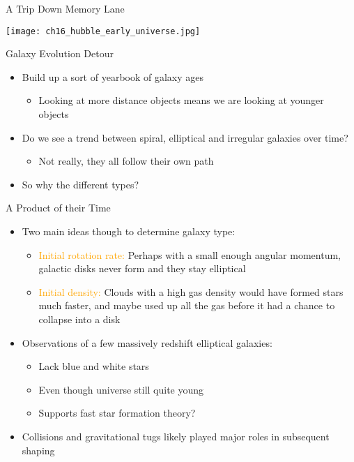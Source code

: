 \documentclass[pdf,aspectratio=169]{beamer}
\begin{document}
\begin{frame}{A Trip Down Memory Lane}
  \begin{center}
	\texttt{[image: ch16\_hubble\_early\_universe.jpg]}
  \end{center}
\end{frame}

\begin{frame}{Galaxy Evolution Detour}
  \begin{itemize}
	\item Build up a sort of yearbook of galaxy ages
	  \begin{itemize}
		\item Looking at more distance objects means we are looking at younger objects
	  \end{itemize}
	\item Do we see a trend between spiral, elliptical and irregular galaxies over time?
	  \begin{itemize}
		\item Not really, they all follow their own path
	  \end{itemize}
	\item So why the different types?
  \end{itemize}
\end{frame}

\begin{frame}{A Product of their Time}
  \begin{itemize}
	\item Two main ideas though to determine galaxy type:
	  \begin{itemize}
		\item \textcolor{Orange}{Initial rotation rate:} Perhaps with a small enough angular momentum, galactic disks never form and they stay elliptical
		\item \textcolor{Orange}{Initial density:} Clouds with a high gas density would have formed stars much faster, and maybe used up all the gas before it had a chance to collapse into a disk
	  \end{itemize}
	\item Observations of a few massively redshift elliptical galaxies:
	  \begin{itemize}
		\item Lack blue and white stars
		\item Even though universe still quite young
		\item Supports fast star formation theory?
	  \end{itemize}
	\item Collisions and gravitational tugs likely played major roles in subsequent shaping
  \end{itemize}
\end{frame}
\end{document}
